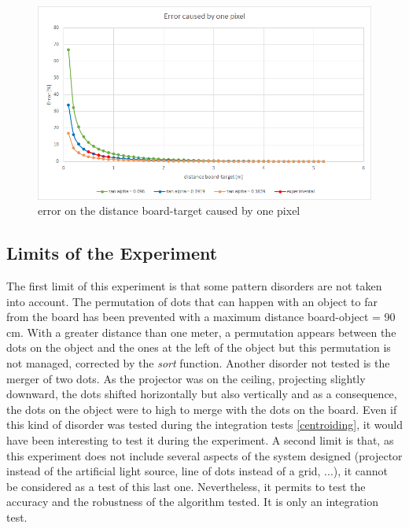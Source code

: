 \begin{figure}[H]
  \centerline{\includegraphics[scale=0.7]{fig/error.png}}
  \caption{error on the distance board-target caused by one pixel}
  \label{fig:error}
\end{figure}



\subsection{Limits of the Experiment}
The first limit of this experiment is that some pattern disorders are not taken into account. The permutation of dots that can happen with an object to far from the board has been prevented with a maximum distance board-object = 90 cm. With a greater distance than one meter, a permutation appears between the dots on the object and the ones at the left of the object but this permutation is not managed, corrected by the \emph{sort} function. Another disorder not tested is the merger of two dots. As the projector was on the ceiling, projecting slightly downward, the dots shifted horizontally but also vertically and as a consequence, the dots on the object were to high to merge with the dots on the board. Even if this kind of disorder was tested during the integration tests \ref{centroiding}, it would have been interesting to test it during the experiment.
A second limit is that, as this experiment does not include several aspects of the system designed (projector instead of the artificial light source, line of dots instead of a grid, ...), it cannot be considered as a test of this last one. Nevertheless, it permits to test the accuracy and the robustness of the algorithm tested. It is only an integration test.





